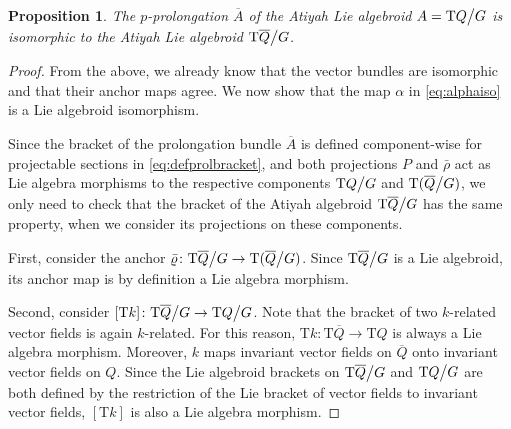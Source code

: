 \documentclass[11pt]{article}
\theoremstyle{plain}
\newtheorem{proposition}{Proposition}
\theoremstyle{definition}
\begin{document}


\begin{proposition}\label{prop4}
The $p$-prolongation $\overline A$ of the Atiyah Lie algebroid $A=\mathrm{T}Q\big\slash G$ is isomorphic to the Atiyah Lie algebroid $\mathrm{T}\overline Q \big\slash G$. 
\end{proposition}
\begin{proof} From the above, we already know that the vector bundles are isomorphic and that their anchor maps agree. We now show that the map $\alpha$ in \eqref{eq:alphaiso} is a Lie algebroid isomorphism.

Since the bracket of the prolongation bundle $\overline A$ is defined component-wise for projectable sections in \eqref{eq:defprolbracket}, and both projections $P$ and $\bar{\rho}$ act as Lie algebra morphisms to the respective components $\mathrm{T} Q\big\slash G$ and $\mathrm{T}(\overline Q\big\slash G)$, we only need to check that the bracket of the Atiyah algebroid $\mathrm{T}\overline Q\big\slash G$ has the same property, when we consider its projections on these components.

First, consider the anchor $\bar{\varrho}\colon \mathrm{T}\overline Q\big\slash G \to \mathrm{T}(\overline Q\big\slash G)$. Since $\mathrm{T}\overline Q\big\slash G$ is a Lie algebroid, its anchor map is by definition a Lie algebra morphism. 

Second, consider $[\mathrm{T}k]\colon \mathrm{T}\overline Q\big\slash G \to \mathrm{T} Q\big\slash G$. Note that the bracket of two $k$-related vector fields is again $k$-related. For this reason, $\mathrm{T}k\colon \mathrm{T}\overline Q \to \mathrm{T} Q$ is always a Lie algebra morphism. Moreover, $k$ maps invariant vector fields on $\overline Q$ onto invariant vector fields on $Q$. Since the Lie algebroid brackets on $\mathrm{T}\overline Q\big\slash G$ and $\mathrm{T} Q\big\slash G$ are both defined by the restriction of the Lie bracket of vector fields to invariant vector fields, $[\mathrm{T}k]$ is also a Lie algebra morphism.
\end{proof}

\end{document}
